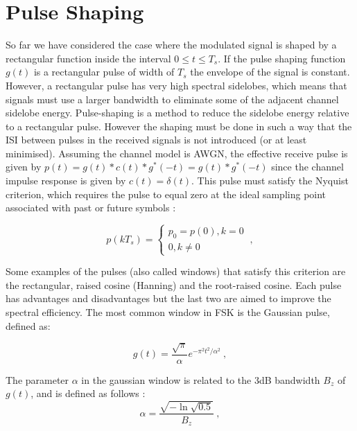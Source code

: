 \documentclass[12pt,a4paper,openright]{report}
\begin{document}
%
\section{Pulse Shaping}
\label{Sec:Pulse shapping}
So far we have considered the case where the modulated signal is shaped by a rectangular function inside the interval $0\leq t \leq T_s$. If the pulse shaping function $g(t)$ is a rectangular pulse of width of $T_s$ the envelope of the signal is constant. However, a rectangular pulse has very high spectral sidelobes, which means that signals must use a larger bandwidth to eliminate some of the adjacent channel sidelobe energy. Pulse-shaping is a method to reduce the sidelobe energy relative to a rectangular pulse. However the shaping must be done in such a way that the ISI between pulses in the received signals is not introduced (or at least minimised). Assuming the channel model is AWGN, the effective receive pulse is given by $p(t)=g(t) \ast c(t) \ast g^{*}(-t)=g(t) \ast g^{*}(-t)$ since the channel impulse response is given by $c(t)=\delta(t)$. This pulse must satisfy the Nyquist criterion, which requires the pulse to equal zero at the ideal sampling point associated with past or future symbols \cite{GoertzelPaper}: 

 \begin{equation}
 p(k{T_s}) = \left\{ \begin{array}{l}
 {p_0} = p(0),k = 0\\
 0,k \ne 0
 \end{array} \right.\ ,
 \end{equation}
 
Some examples of the pulses (also called windows) that satisfy this criterion are the rectangular, raised cosine (Hanning) and the root-raised cosine. Each pulse has advantages and disadvantages but the last two are aimed to improve the spectral efficiency. The most common window in FSK is the Gaussian pulse, defined as: 

 
\begin{equation}\label{Eq:Gaussian Window}
g(t) = \frac{{\sqrt \pi  }}{\alpha }{e^{ - {\pi ^2}{t^2}/{\alpha ^2}}}\ ,
\end{equation}

 The parameter $\alpha$ in the gaussian window is related to the 3dB bandwidth $B_z$ of $g(t)$, and is defined as follows \cite{GoertzelPaper}:
\begin{equation}
\alpha  = \frac{{\sqrt { - \ln \sqrt {0.5} } }}{{{B_z}}}\ ,
\end{equation}
 
\end{document}
